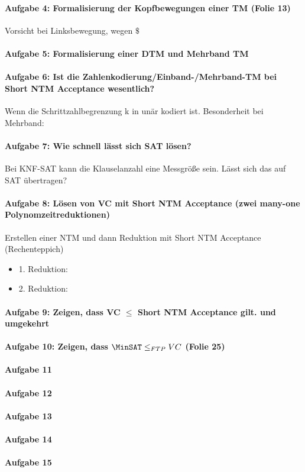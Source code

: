 \documentclass[ngerman]{scrartcl}
\begin{document}
\paragraph{Aufgabe 4: Formalisierung der Kopfbewegungen einer TM (Folie 13)}
Vorsicht bei Linksbewegung, wegen $ \$ $
\paragraph{Aufgabe 5: Formalisierung einer DTM und Mehrband TM}


\paragraph{Aufgabe 6: Ist die Zahlenkodierung/Einband-/Mehrband-TM bei Short NTM Acceptance wesentlich?}
Wenn die Schrittzahlbegrenzung k in unär kodiert ist. Besonderheit bei Mehrband: 

\paragraph{Aufgabe 7: Wie schnell lässt sich SAT lösen?}
Bei KNF-SAT kann die Klauselanzahl eine Messgröße sein. Lässt sich das auf SAT übertragen?

\paragraph{Aufgabe 8: Lösen von VC mit Short NTM Acceptance (zwei many-one Polynomzeitreduktionen)} Erstellen einer NTM und dann Reduktion mit Short NTM Acceptance (Rechenteppich) 
\begin{itemize}
    \item 1. Reduktion:
    \item 2. Reduktion:
\end{itemize}

\paragraph{Aufgabe 9: Zeigen, dass VC $\leq$ Short NTM Acceptance gilt. und umgekehrt}


\paragraph{Aufgabe 10: Zeigen, dass $ \MinSAT \leq_{FTP} VC $ (Folie 25)}
\paragraph{Aufgabe 11}
\paragraph{Aufgabe 12}
\paragraph{Aufgabe 13}
\paragraph{Aufgabe 14}
\paragraph{Aufgabe 15}
\end{document}
